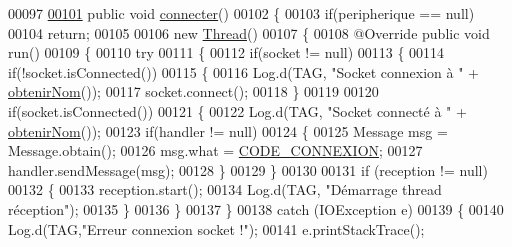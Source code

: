 \begin{DoxyCode}
00097 
\hyperlink{classcom_1_1example_1_1ekawa_1_1_peripherique_aeec8c1b360496726a5aecd6c129de81b}{00101}     \textcolor{keyword}{public} \textcolor{keywordtype}{void} \hyperlink{classcom_1_1example_1_1ekawa_1_1_peripherique_aeec8c1b360496726a5aecd6c129de81b}{connecter}()
00102     \{
00103         \textcolor{keywordflow}{if}(peripherique == null)
00104             \textcolor{keywordflow}{return};
00105 
00106         \textcolor{keyword}{new} \hyperlink{class_thread}{Thread}()
00107         \{
00108             @Override \textcolor{keyword}{public} \textcolor{keywordtype}{void} run()
00109             \{
00110                 \textcolor{keywordflow}{try}
00111                 \{
00112                     \textcolor{keywordflow}{if}(socket != null)
00113                     \{
00114                         \textcolor{keywordflow}{if}(!socket.isConnected())
00115                         \{
00116                             Log.d(TAG, \textcolor{stringliteral}{"Socket connexion à "} + \hyperlink{classcom_1_1example_1_1ekawa_1_1_peripherique_ad54cfafe03dfcf18cbd9b20602c4d86e}{obtenirNom}());
00117                             socket.connect();
00118                         \}
00119 
00120                         \textcolor{keywordflow}{if}(socket.isConnected())
00121                         \{
00122                             Log.d(TAG, \textcolor{stringliteral}{"Socket connecté à "} + \hyperlink{classcom_1_1example_1_1ekawa_1_1_peripherique_ad54cfafe03dfcf18cbd9b20602c4d86e}{obtenirNom}());
00123                             \textcolor{keywordflow}{if}(handler != null)
00124                             \{
00125                                 Message msg = Message.obtain();
00126                                 msg.what = \hyperlink{classcom_1_1example_1_1ekawa_1_1_peripherique_addb8ee767dc82567360551db1004463e}{CODE\_CONNEXION};
00127                                 handler.sendMessage(msg);
00128                             \}
00129                         \}
00130 
00131                         \textcolor{keywordflow}{if} (reception != null)
00132                         \{
00133                             reception.start();
00134                             Log.d(TAG, \textcolor{stringliteral}{"Démarrage thread réception"});
00135                         \}
00136                     \}
00137                 \}
00138                 \textcolor{keywordflow}{catch} (IOException e)
00139                 \{
00140                     Log.d(TAG,\textcolor{stringliteral}{"Erreur connexion socket !"});
00141                     e.printStackTrace();

\end{DoxyCode}
